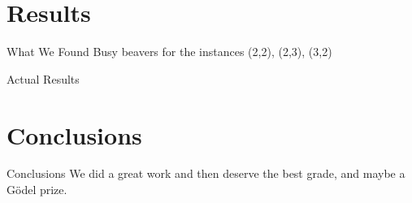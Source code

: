 \documentclass{beamer}
\begin{document}
\section{Results}

\begin{frame}{What We Found}
Busy beavers for the instances (2,2), (2,3), (3,2)
\end{frame}

\begin{frame}{Actual Results}
\end{frame}

\section{Conclusions}

\begin{frame}{Conclusions}
We did a great work and then deserve the best grade, and maybe a Gödel prize.
\end{frame}
\end{document}
